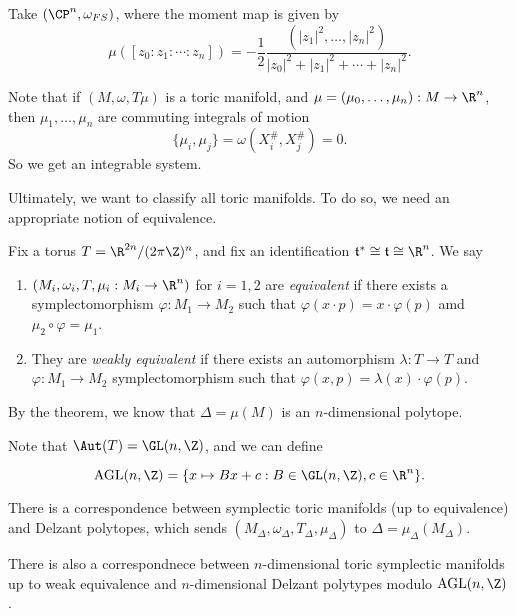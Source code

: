\documentclass[a4paper]{article}
\begin{document}
\begin{eg}
  Take $(\CP^n, \omega_{FS})$, where the moment map is given by
  \[
    \mu([z_0:z_1:\cdots :z_n]) = - \frac{1}{2} \frac{(|z_1|^2, \ldots, |z_n|^2)}{|z_0|^2 + |z_1|^2 + \cdots + |z_n|^2}.
  \]
\end{eg}
Note that if $(M, \omega, T \mu)$ is a toric manifold, and $\mu = (\mu_0, \ldots, \mu_n): M \to \R^n$, then $\mu_1, \ldots, \mu_n$ are commuting integrals of motion
\[
  \{\mu_i, \mu_j\} = \omega(X_i^\#, X_j^\#) = 0.
\]
So we get an integrable system.

Ultimately, we want to classify all toric manifolds. To do so, we need an appropriate notion of equivalence.

\begin{defi}
  Fix a torus $T = \R^{2n}/(2\pi \Z)^n$, and fix an identification $\mathfrak{t}^* \cong \mathfrak{t} \cong \R^n$. We say
  \begin{enumerate}
    \item $(M_i, \omega_i, T, \mu_i: M_i \to \R^n)$ for $i = 1, 2$ are \emph{equivalent} if there exists a symplectomorphism $\varphi: M_1 \to M_2$ such that $\varphi(x \cdot p) = x \cdot \varphi(p)$ amd $\mu_2 \circ \varphi = \mu_1$.
    \item They are \emph{weakly equivalent} if there exists an automorphism $\lambda: T \to T$ and $\varphi: M_1 \to M_2$ symplectomorphism such that $\varphi(x, p) = \lambda(x) \cdot \varphi(p)$.
  \end{enumerate}
\end{defi}

By the theorem, we know that $\Delta = \mu(M)$ is an $n$-dimensional polytope.

Note that $\Aut(T) = \GL(n, \Z)$, and we can define
\begin{defi}
  \[
    \mathrm{AGL}(n, \Z) = \{x \mapsto Bx + c: B \in \GL(n, \Z), c \in \R^n\}.
  \]
\end{defi}

\begin{thm}
  There is a correspondence between symplectic toric manifolds (up to equivalence) and Delzant polytopes, which sends $(M_\Delta, \omega_\Delta, T_\Delta, \mu_\Delta)$ to $\Delta = \mu_\Delta(M_\Delta)$.

  There is also a correspondnece between $n$-dimensional toric symplectic manifolds up to weak equivalence and $n$-dimensional Delzant polytypes modulo $\mathrm{AGL}(n, \Z)$.
\end{thm}
\end{document}
